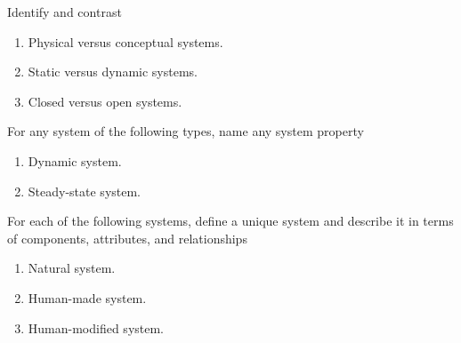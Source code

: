 \begin{exercises}
    \begin{exercise} 
    \label{sea-1-6_7_8}
        Identify and contrast
        \begin{enumerate}[label=\alph*)]
            \item Physical versus conceptual systems.
            \item Static versus dynamic systems.
            \item Closed versus open systems.
        \end{enumerate}
    \end{exercise}
    \begin{solution}
    \end{solution}
    
    \begin{exercise} 
    \label{sea-1-15}
        For any system of the following types, name any system property
        \begin{enumerate}[label=\alph*)]
            \item Dynamic system.
            \item Steady-state system.
        \end{enumerate}
    \end{exercise}
    \begin{solution}
    \end{solution}
    
    \begin{exercise} 
    \label{sea-1-9}
        For each of the following systems, define a unique system and describe it in terms of components, attributes, and relationships
        \begin{enumerate}[label=\alph*)]
            \item Natural system.
            \item Human-made system.
            \item Human-modified system.
        \end{enumerate}
    \end{exercise}
    \begin{solution}
    \end{solution}
    

\end{exercises}
